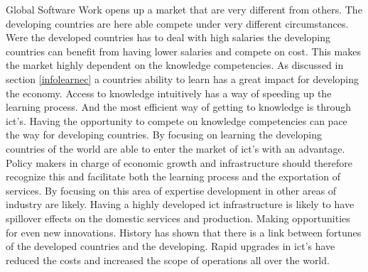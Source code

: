 Global Software Work opens up a market that are very different from others.
The developing countries are here able compete under very different circumstances.
Were the developed countries has to deal with high salaries the developing countries can benefit from having lower salaries and compete on cost. This makes the market highly dependent on the knowledge competencies. As discussed in section \ref{infolearnec} a countries ability to learn has a great impact for developing the economy. Access to knowledge intuitively has a way of speeding up the learning process. And the most efficient way of getting to knowledge is through \gls{ict}'s. 
Having the opportunity to compete on knowledge competencies can pace the way for developing countries. By focusing on learning the developing countries of the world are able to enter the market of \gls{ict}'s with an advantage. Policy makers in charge of economic growth and infrastructure should therefore recognize this and facilitate both the learning process and the exportation of services. 
By focusing on this area of expertise development in other areas of industry are likely.
Having a highly developed \gls{ict} infrastructure is likely to have spillover effects on the domestic services and production. Making opportunities for even new innovations. 
History has shown that there is a link between fortunes of the developed countries and the developing. Rapid upgrades in \gls{ict}'s have reduced the costs and increased the scope of operations all over the world. 


\cite{sbs:gio}
\cite{offit:paan}